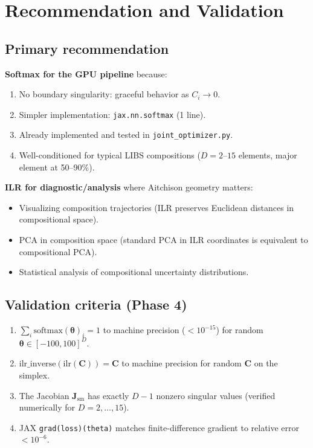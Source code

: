 \documentclass[11pt]{article}
\newcommand{\CC}{\mathbf{C}}
\newcommand{\ttheta}{\boldsymbol{\theta}}
\newcommand{\JJ}{\mathbf{J}}
\begin{document}
\section{Recommendation and Validation}
\label{sec:recommendation}

\subsection{Primary recommendation}

\textbf{Softmax for the GPU pipeline} because:
\begin{enumerate}
  \item No boundary singularity: graceful behavior as $C_i \to 0$.
  \item Simpler implementation: \texttt{jax.nn.softmax} (1 line).
  \item Already implemented and tested in \texttt{joint\_optimizer.py}.
  \item Well-conditioned for typical LIBS compositions ($D = 2$--$15$
    elements, major element at 50--90\%).
\end{enumerate}

\textbf{ILR for diagnostic/analysis} where Aitchison geometry matters:
\begin{itemize}
  \item Visualizing composition trajectories (ILR preserves Euclidean
    distances in compositional space).
  \item PCA in composition space (standard PCA in ILR coordinates is
    equivalent to compositional PCA).
  \item Statistical analysis of compositional uncertainty distributions.
\end{itemize}

\subsection{Validation criteria (Phase 4)}

\begin{enumerate}
  \item $\sum_i \mathrm{softmax}(\ttheta)_i = 1$ to machine precision
    ($< 10^{-15}$) for random $\ttheta \in [-100, 100]^D$.
  \item $\mathrm{ilr\_inverse}(\mathrm{ilr}(\CC)) = \CC$ to machine
    precision for random $\CC$ on the simplex.
  \item The Jacobian $\JJ_\mathrm{sm}$ has exactly $D-1$ nonzero
    singular values (verified numerically for $D = 2, \ldots, 15$).
  \item JAX \texttt{grad(loss)(theta)} matches finite-difference
    gradient to relative error $< 10^{-6}$.
\end{enumerate}
\end{document}
